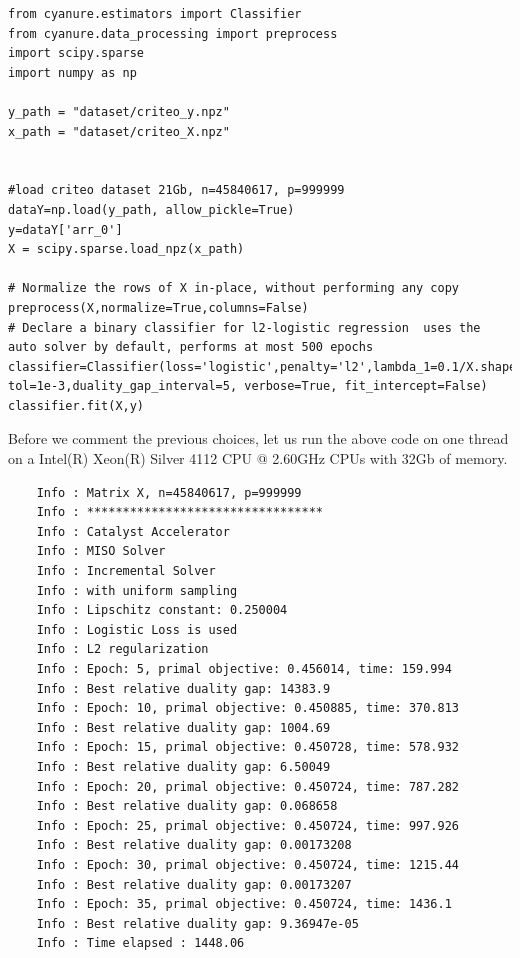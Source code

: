 \documentclass{article}
\begin{document}
\begin{verbatim}
from cyanure.estimators import Classifier
from cyanure.data_processing import preprocess
import scipy.sparse
import numpy as np

y_path = "dataset/criteo_y.npz"
x_path = "dataset/criteo_X.npz"


#load criteo dataset 21Gb, n=45840617, p=999999
dataY=np.load(y_path, allow_pickle=True)
y=dataY['arr_0']
X = scipy.sparse.load_npz(x_path)

# Normalize the rows of X in-place, without performing any copy
preprocess(X,normalize=True,columns=False)
# Declare a binary classifier for l2-logistic regression  uses the auto solver by default, performs at most 500 epochs
classifier=Classifier(loss='logistic',penalty='l2',lambda_1=0.1/X.shape[0],max_iter=500,
tol=1e-3,duality_gap_interval=5, verbose=True, fit_intercept=False)
classifier.fit(X,y)
\end{verbatim}

Before we comment the previous choices, let us run the above code on one thread on a Intel(R) Xeon(R) Silver 4112 CPU @ 2.60GHz CPUs with 32Gb of memory.

\begin{minipage}{\linewidth}
\begin{verbatim}
    Info : Matrix X, n=45840617, p=999999
    Info : *********************************
    Info : Catalyst Accelerator
    Info : MISO Solver
    Info : Incremental Solver
    Info : with uniform sampling
    Info : Lipschitz constant: 0.250004
    Info : Logistic Loss is used
    Info : L2 regularization
    Info : Epoch: 5, primal objective: 0.456014, time: 159.994
    Info : Best relative duality gap: 14383.9
    Info : Epoch: 10, primal objective: 0.450885, time: 370.813
    Info : Best relative duality gap: 1004.69
    Info : Epoch: 15, primal objective: 0.450728, time: 578.932
    Info : Best relative duality gap: 6.50049
    Info : Epoch: 20, primal objective: 0.450724, time: 787.282
    Info : Best relative duality gap: 0.068658
    Info : Epoch: 25, primal objective: 0.450724, time: 997.926
    Info : Best relative duality gap: 0.00173208
    Info : Epoch: 30, primal objective: 0.450724, time: 1215.44
    Info : Best relative duality gap: 0.00173207
    Info : Epoch: 35, primal objective: 0.450724, time: 1436.1
    Info : Best relative duality gap: 9.36947e-05
    Info : Time elapsed : 1448.06
\end{verbatim}
\end{minipage}
\end{document}
